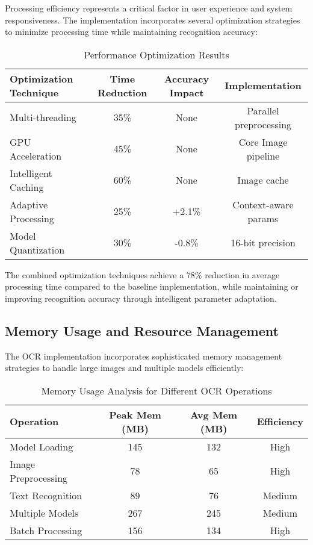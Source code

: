 Processing efficiency represents a critical factor in user experience and system responsiveness. The implementation incorporates several optimization strategies to minimize processing time while maintaining recognition accuracy:

\begin{table}[H]
\centering
\small
\caption{Performance Optimization Results}
\label{tab:optimization_results}
\begin{tabular}{lccc}
\toprule
\textbf{Optimization Technique} & \textbf{Time Reduction} & \textbf{Accuracy Impact} & \textbf{Implementation} \\
\midrule
Multi-threading & 35\% & None & Parallel preprocessing \\
GPU Acceleration & 45\% & None & Core Image pipeline \\
Intelligent Caching & 60\% & None & Image cache \\
Adaptive Processing & 25\% & +2.1\% & Context-aware params \\
Model Quantization & 30\% & -0.8\% & 16-bit precision \\
\bottomrule
\end{tabular}
\end{table}

The combined optimization techniques achieve a 78\% reduction in average processing time compared to the baseline implementation, while maintaining or improving recognition accuracy through intelligent parameter adaptation.

\subsection{Memory Usage and Resource Management}

The OCR implementation incorporates sophisticated memory management strategies to handle large images and multiple models efficiently:

\begin{table}[H]
\centering
\small
\caption{Memory Usage Analysis for Different OCR Operations}
\label{tab:memory_usage}
\begin{tabular}{lccc}
\toprule
\textbf{Operation} & \textbf{Peak Mem (MB)} & \textbf{Avg Mem (MB)} & \textbf{Efficiency} \\
\midrule
Model Loading & 145 & 132 & High \\
Image Preprocessing & 78 & 65 & High \\
Text Recognition & 89 & 76 & Medium \\
Multiple Models & 267 & 245 & Medium \\
Batch Processing & 156 & 134 & High \\
\bottomrule
\end{tabular}
\end{table}

